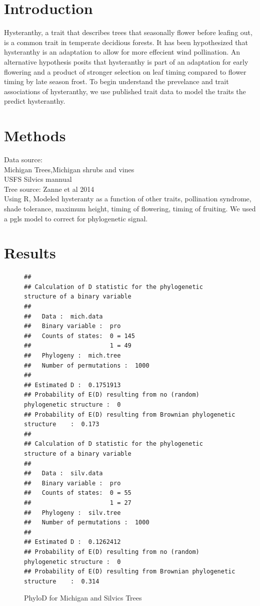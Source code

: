 \documentclass{article}\usepackage[]{graphicx}\usepackage[]{color}
\makeatletter
\newenvironment{kframe}{%
 \def\at@end@of@kframe{}%
 \ifinner\ifhmode%
  \def\at@end@of@kframe{\end{minipage}}%
  \begin{minipage}{\columnwidth}%
 \fi\fi%
 \def\FrameCommand##1{\hskip\@totalleftmargin \hskip-\fboxsep
 \colorbox{shadecolor}{##1}\hskip-\fboxsep
     \hskip-\linewidth \hskip-\@totalleftmargin \hskip\columnwidth}%
 \MakeFramed {\advance\hsize-\width
   \@totalleftmargin\z@ \linewidth\hsize
   \@setminipage}}%
 {\par\unskip\endMakeFramed%
 \at@end@of@kframe}
\newenvironment{knitrout}{}{} %
\makeatother
\begin{document}
\section*{Introduction}
Hysteranthy, a trait that describes trees that seasonally flower before leafing out, is a common trait in temperate decidious forests. It has been hypothesized that hysteranthy is an adaptation to allow for more effecient wind pollination. An alternative hypothesis posits that hysteranthy is part of an adaptation for early flowering and a product of stronger selection on leaf timing compared to flower timing by late season frost. To begin understand the prevelance and trait associations of hysteranthy, we use published trait data to model the traits the predict hysteranthy.

\section*{Methods}
Data source:\\ Michigan Trees,Michigan shrubs and vines\\ USFS Silvics mannual\\
Tree source: Zanne et al 2014\\
Using R, Modeled hysteranty as a function of other traits, pollination syndrome, shade tolerance, maximum height, timing of flowering, timing of fruiting. We used a pgls model to correct for phylogenetic signal.

\section*{Results}
\begin{figure}[h!]
\begin{knitrout}
\color{fgcolor}\begin{kframe}
\begin{verbatim}
## 
## Calculation of D statistic for the phylogenetic structure of a binary variable
## 
##   Data :  mich.data
##   Binary variable :  pro
##   Counts of states:  0 = 145
##                      1 = 49
##   Phylogeny :  mich.tree
##   Number of permutations :  1000
## 
## Estimated D :  0.1751913
## Probability of E(D) resulting from no (random) phylogenetic structure :  0
## Probability of E(D) resulting from Brownian phylogenetic structure    :  0.173
## 
## Calculation of D statistic for the phylogenetic structure of a binary variable
## 
##   Data :  silv.data
##   Binary variable :  pro
##   Counts of states:  0 = 55
##                      1 = 27
##   Phylogeny :  silv.tree
##   Number of permutations :  1000
## 
## Estimated D :  0.1262412
## Probability of E(D) resulting from no (random) phylogenetic structure :  0
## Probability of E(D) resulting from Brownian phylogenetic structure    :  0.314
\end{verbatim}
\end{kframe}
\end{knitrout}
\caption{PhyloD for Michigan and Silvics Trees}
\end{figure}
\end{document}
